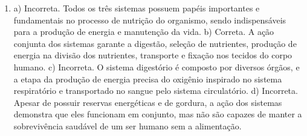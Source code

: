 \begin{enumerate}
\item
a) Incorreta. Todos os três sistemas possuem papéis importantes e
fundamentais no processo de nutrição do organismo, sendo indispensáveis
para a produção de energia e manutenção da vida.
b) Correta. A ação conjunta dos sistemas garante a digestão, seleção de
nutrientes, produção de energia na divisão dos nutrientes, transporte e
fixação nos tecidos do corpo humano.
c) Incorreta. O sistema digestório é composto por diversos órgãos, e a
etapa da produção de energia precisa do oxigênio inspirado no sistema
respiratório e transportado no sangue pelo sistema circulatório.
d) Incorreta. Apesar de possuir reservas energéticas e de gordura, a
ação dos sistemas demonstra que eles funcionam em conjunto, mas não são
capazes de manter a sobrevivência saudável de um ser humano sem a
alimentação.
\end{enumerate}

\blankpage